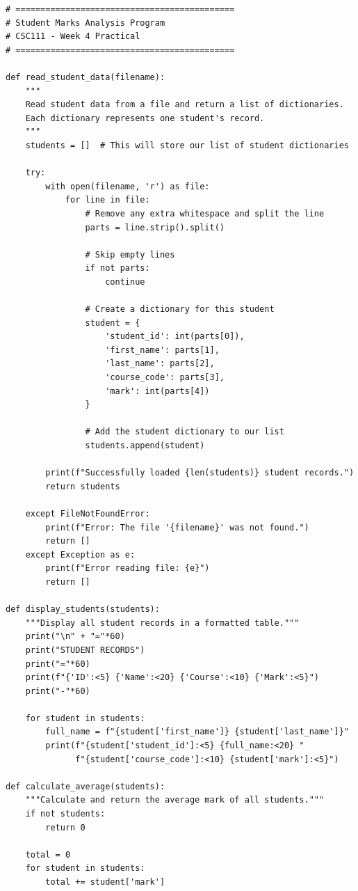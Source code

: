 \documentclass[a4paper,11pt]{article}
\theoremstyle{mytheor}
\begin{document}
\begin{lstlisting}
# ============================================
# Student Marks Analysis Program
# CSC111 - Week 4 Practical
# ============================================

def read_student_data(filename):
    """
    Read student data from a file and return a list of dictionaries.
    Each dictionary represents one student's record.
    """
    students = []  # This will store our list of student dictionaries
    
    try:
        with open(filename, 'r') as file:
            for line in file:
                # Remove any extra whitespace and split the line
                parts = line.strip().split()
                
                # Skip empty lines
                if not parts:
                    continue
                
                # Create a dictionary for this student
                student = {
                    'student_id': int(parts[0]),
                    'first_name': parts[1],
                    'last_name': parts[2],
                    'course_code': parts[3],
                    'mark': int(parts[4])
                }
                
                # Add the student dictionary to our list
                students.append(student)
        
        print(f"Successfully loaded {len(students)} student records.")
        return students
        
    except FileNotFoundError:
        print(f"Error: The file '{filename}' was not found.")
        return []
    except Exception as e:
        print(f"Error reading file: {e}")
        return []

def display_students(students):
    """Display all student records in a formatted table."""
    print("\n" + "="*60)
    print("STUDENT RECORDS")
    print("="*60)
    print(f"{'ID':<5} {'Name':<20} {'Course':<10} {'Mark':<5}")
    print("-"*60)
    
    for student in students:
        full_name = f"{student['first_name']} {student['last_name']}"
        print(f"{student['student_id']:<5} {full_name:<20} "
              f"{student['course_code']:<10} {student['mark']:<5}")

def calculate_average(students):
    """Calculate and return the average mark of all students."""
    if not students:
        return 0
    
    total = 0
    for student in students:
        total += student['mark']
    

\end{lstlisting}
\end{document}
